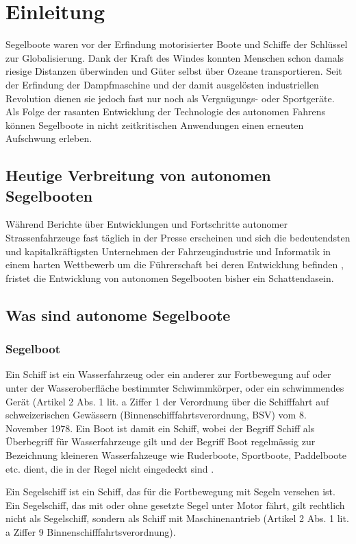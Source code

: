 
\chapter{Einleitung }
\label{chap:einleitung}
Segelboote waren vor der Erfindung motorisierter Boote und Schiffe der Schlüssel zur Globalisierung. Dank der Kraft des Windes konnten Menschen schon damals riesige Distanzen überwinden und Güter selbst über Ozeane transportieren. Seit der Erfindung der Dampfmaschine und der damit ausgelösten industriellen Revolution dienen sie jedoch fast nur noch als Vergnügungs- oder Sportgeräte. Als Folge der rasanten Entwicklung der Technologie des autonomen Fahrens können Segelboote in nicht zeitkritischen Anwendungen einen erneuten Aufschwung erleben.

\section{Heutige Verbreitung von autonomen Segelbooten}
Während Berichte über Entwicklungen und Fortschritte autonomer Strassenfahrzeuge fast täglich in der Presse erscheinen und sich die bedeutendsten und kapitalkräftigsten Unternehmen der Fahrzeugindustrie und Informatik in einem harten Wettbewerb um die Führerschaft bei deren Entwicklung befinden \cite{noauthor_autonomes_2023}, fristet die Entwicklung von autonomen Segelbooten bisher ein Schattendasein. 

\section{Was sind autonome Segelboote}
\subsection{Segelboot}
Ein Schiff ist ein Wasserfahrzeug oder ein anderer zur Fortbewegung auf oder unter der Wasseroberfläche bestimmter Schwimmkörper, oder ein schwimmendes Gerät (Artikel 2 Abs. 1 lit. a Ziffer 1 der Verordnung über die Schifffahrt auf schweizerischen Gewässern (Binnenschifffahrtsverordnung, BSV) vom 8. November 1978. Ein Boot ist damit ein Schiff, wobei der Begriff Schiff als Überbegriff für Wasserfahrzeuge gilt und der Begriff Boot regelmässig zur Bezeichnung kleineren Wasserfahzeuge wie Ruderboote, Sportboote, Paddelboote etc. dient, die in der Regel nicht eingedeckt sind \cite{noauthor_boot_2023}. 

Ein Segelschiff ist ein Schiff, das für die Fortbewegung mit Segeln versehen ist. Ein Segelschiff, das mit oder ohne gesetzte Segel unter Motor fährt, gilt rechtlich nicht als Segelschiff, sondern als Schiff mit Maschinenantrieb (Artikel 2 Abs. 1 lit. a Ziffer 9 Binnenschifffahrtsverordnung). 

